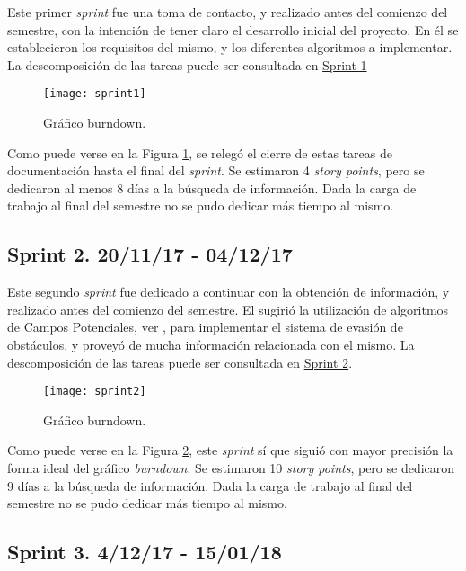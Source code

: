 Este primer \emph{sprint} fue una toma de contacto, y realizado antes del comienzo del semestre, con la intención de tener claro el desarrollo inicial del proyecto. 
En él se establecieron los requisitos del mismo, y los diferentes algoritmos a implementar. 
La descomposición de las tareas puede ser consultada en \href{https://github.com/mbm0089/gii_0_17.02_snsi/milestone/1?closed=1}{Sprint 1}

\begin{figure}[H]
	\centering
	\texttt{[image: sprint1]}
	\caption[Burndown Sprint 1]{Gráfico burndown.}\label{fig:sprint1}
\end{figure}

Como puede verse en la Figura \ref{fig:sprint1}, se relegó el cierre de estas tareas de documentación hasta el final del \emph{sprint}.
Se estimaron 4 \emph{story points}, pero se dedicaron al menos 8 días a la búsqueda de información. Dada la carga de trabajo al final del semestre no se pudo dedicar más tiempo al mismo.

\subsection{Sprint 2. 20/11/17 - 04/12/17}

Este segundo \emph{sprint} fue dedicado a continuar con la obtención de información, y realizado antes del comienzo del semestre.
El \tutor{} sugirió la utilización de algoritmos de Campos Potenciales, ver \citep{art:BorensteinLims}, para implementar el sistema de evasión de obstáculos, y proveyó de mucha información relacionada con el mismo.
La descomposición de las tareas puede ser consultada en \href{https://github.com/mbm0089/gii_0_17.02_snsi/milestone/2?closed=1}{Sprint 2}.

\begin{figure}[H]
	\centering
	\texttt{[image: sprint2]}
	\caption[Burndown Sprint 2]{Gráfico burndown.}\label{fig:sprint2}
\end{figure}

Como puede verse en la Figura \ref{fig:sprint2}, este \emph{sprint} sí que siguió con mayor precisión la forma ideal del gráfico \emph{burndown}.
Se estimaron 10 \emph{story points}, pero se dedicaron 9 días a la búsqueda de información. Dada la carga de trabajo al final del semestre no se pudo dedicar más tiempo al mismo.

\subsection{Sprint 3. 4/12/17 - 15/01/18}

